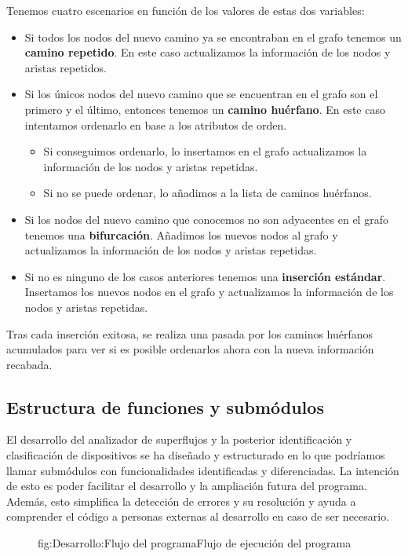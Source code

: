 \documentclass[tfg,epsbased,lof,lot,loa,final,nocopyright,overleaf]{tfgtfmthesisuam}
\begin{document}
Tenemos cuatro escenarios en función de los valores de estas dos variables:
\begin{itemize}
    \item Si todos los nodos del nuevo camino ya se encontraban en el grafo tenemos un \textbf{camino repetido}. En este caso actualizamos la información de los nodos y aristas repetidos.
    \item Si los únicos nodos del nuevo camino que se encuentran en el grafo son el primero y el último, entonces tenemos un \textbf{camino huérfano}. En este caso intentamos ordenarlo en base a los atributos de orden.
    \begin{itemize}
        \item Si conseguimos ordenarlo, lo insertamos en el grafo actualizamos la información de los nodos y aristas repetidas.
        \item Si no se puede ordenar, lo añadimos a la lista de caminos huérfanos.
    \end{itemize}
    \item Si los nodos del nuevo camino que conocemos no son adyacentes en el grafo tenemos una \textbf{bifurcación}. Añadimos los nuevos nodos al grafo y actualizamos la información de los nodos y aristas repetidas.
    \item Si no es ninguno de los casos anteriores tenemos una \textbf{inserción estándar}. Insertamos los nuevos nodos en el grafo y actualizamos la información de los nodos y aristas repetidas.
\end{itemize}
Tras cada inserción exitosa, se realiza una pasada por los caminos huérfanos acumulados para ver si es posible ordenarlos ahora con la nueva información recabada.

\subsection{Estructura de funciones y submódulos}
\label{subsec:Desarrollo:Ordenacion:EstructuraFunciones}
El desarrollo del analizador de superflujos y la posterior identificación y clasificación de dispositivos se ha diseñado y estructurado en lo que podríamos llamar submódulos con funcionalidades identificadas y diferenciadas. La intención de esto es poder facilitar el desarrollo y la ampliación futura del programa. Además, esto simplifica la detección de errores y su resolución y ayuda a comprender el código a personas externas al desarrollo en caso de ser necesario.

\begin{figure}[Flujo del programa]{fig:Desarrollo:Flujo del programa}{Flujo de ejecución del programa}

\end{figure}
\end{document}
